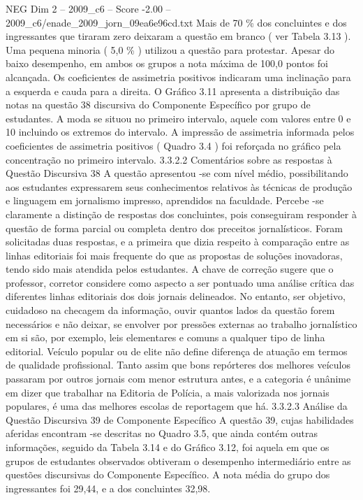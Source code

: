 \begin{textsample}{NEG Dim 2 – 2009\_c6 – Score -2.00 – 2009\_c6/enade\_2009\_jorn\_09ea6e96cd.txt}
Mais de 70 \% dos concluintes e dos ingressantes que tiraram zero deixaram a questão em branco ( ver Tabela 3.13 ).
Uma pequena minoria ( 5,0 \% ) utilizou a questão para protestar.
Apesar do baixo desempenho, em ambos os grupos a nota máxima de 100,0 pontos foi alcançada.
Os coeficientes de assimetria positivos indicaram uma inclinação para a esquerda e cauda para a direita.
O Gráfico 3.11 apresenta a distribuição das notas na questão 38 discursiva do Componente Específico por grupo de estudantes.
A moda se situou no primeiro intervalo, aquele com valores entre 0 e 10 incluindo os extremos do intervalo.
A impressão de assimetria informada pelos coeficientes de assimetria positivos ( Quadro 3.4 ) foi reforçada no gráfico pela concentração no primeiro intervalo. 3.3.2.2 Comentários sobre as respostas à Questão Discursiva 38 A questão apresentou -se com nível médio, possibilitando aos estudantes expressarem seus conhecimentos relativos às técnicas de produção e linguagem em jornalismo impresso, aprendidos na faculdade.
Percebe -se claramente a distinção de respostas dos concluintes, pois conseguiram responder à questão de forma parcial ou completa dentro dos preceitos jornalísticos.
Foram solicitadas duas respostas, e a primeira que dizia respeito à comparação entre as linhas editoriais foi mais frequente do que as propostas de soluções inovadoras, tendo sido mais atendida pelos estudantes.
A chave de correção sugere que o professor, corretor considere como aspecto a ser pontuado uma análise crítica das diferentes linhas editoriais dos dois jornais delineados.
No entanto, ser objetivo, cuidadoso na checagem da informação, ouvir quantos lados da questão forem necessários e não deixar, se envolver por pressões externas ao trabalho jornalístico em si são, por exemplo, leis elementares e comuns a qualquer tipo de linha editorial.
Veículo popular ou de elite não define diferença de atuação em termos de qualidade profissional.
Tanto assim que bons repórteres dos melhores veículos passaram por outros jornais com menor estrutura antes, e a categoria é unânime em dizer que trabalhar na Editoria de Polícia, a mais valorizada nos jornais populares, é uma das melhores escolas de reportagem que há. 3.3.2.3 Análise da Questão Discursiva 39 de Componente Específico A questão 39, cujas habilidades aferidas encontram -se descritas no Quadro 3.5, que ainda contém outras informações, seguido da Tabela 3.14 e do Gráfico 3.12, foi aquela em que os grupos de estudantes observados obtiveram o desempenho intermediário entre as questões discursivas do Componente Específico.
A nota média do grupo dos ingressantes foi 29,44, e a dos concluintes 32,98.

\end{textsample}
